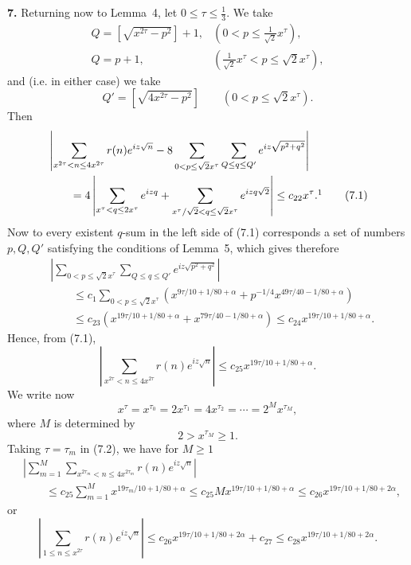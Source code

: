 \documentclass[11pt]{article}
\begin{document}
\medskip
\noindent\textbf{7.}
Returning now to Lemma~4, let $0\leq\tau\leq\frac13$. We take
\[
\begin{array}{ll}
 Q=\left[\sqrt{x^{2\tau}-p^2}\right]+1,
 &\displaystyle\left(0<p\leq\frac1{\sqrt2}x^\tau\right),\\[6pt]
 Q=p+1,
 &\displaystyle\left(\frac1{\sqrt2}x^\tau<p\leq\sqrt2x^\tau\right),
\end{array}
\]
and (i.e. in either case) we take
\[
 Q'=\left[\sqrt{4x^{2\tau}-p^2}\right]
 \qquad(0<p\leq\sqrt2x^\tau).
\]
Then
\begin{align*}
&\left|\sum_{x^{2\tau}<n\leq4x^{2\tau}}r(n)e^{iz\sqrt n}
 -8\sum_{0<p\leq\sqrt2x^\tau}\sum_{Q\leq q\leq Q'}
 e^{iz\sqrt{p^2+q^2}}\right| \\
&\qquad=4\left|\sum_{x^\tau<q\leq2x^\tau}e^{izq}
 +\sum_{x^\tau/\sqrt2<q\leq\sqrt2x^\tau}e^{izq\sqrt2}\right|
 \leq c_{22}x^\tau.\footnotemark
\tag{7.1}
\end{align*}
Now to every existent $q$-sum in the left side of (7.1) corresponds a set of
numbers $p,Q,Q'$ satisfying the conditions of Lemma~5, which gives therefore
\begin{align*}
&\left|\sum_{0<p\leq\sqrt2x^\tau}\sum_{Q\leq q\leq Q'}
 e^{iz\sqrt{p^2+q^2}}\right| \\
&\qquad\leq c_1\sum_{0<p\leq\sqrt2x^\tau}
 \left(x^{9\tau/10+1/80+\alpha}
 +p^{-1/4}x^{49\tau/40-1/80+\alpha}\right) \\
&\qquad\leq c_{23}\left(x^{19\tau/10+1/80+\alpha}
 +x^{79\tau/40-1/80+\alpha}\right)
 \leq c_{24}x^{19\tau/10+1/80+\alpha}.
\end{align*}
Hence, from (7.1),
\begin{equation}
 \left|\sum_{x^{2\tau}<n\leq4x^{2\tau}}r(n)e^{iz\sqrt n}\right|
 \leq c_{25}x^{19\tau/10+1/80+\alpha}.
 \tag{7.2}
\end{equation}
We write now
\[
 x^\tau=x^{\tau_0}=2x^{\tau_1}=4x^{\tau_2}=\cdots=2^M x^{\tau_M},
\]
where $M$ is determined by
\[
 2>x^{\tau_M}\geq1.
\]
Taking $\tau=\tau_m$ in (7.2), we have for $M\geq1$
\begin{align*}
&\left|\sum_{m=1}^{M}\sum_{x^{2\tau_m}<n\leq4x^{2\tau_m}}
 r(n)e^{iz\sqrt n}\right| \\
&\qquad\leq c_{25}\sum_{m=1}^{M}x^{19\tau_m/10+1/80+\alpha}
 \leq c_{25}Mx^{19\tau/10+1/80+\alpha}
 \leq c_{26}x^{19\tau/10+1/80+2\alpha},
\end{align*}
or
\[
 \left|\sum_{1\leq n\leq x^{2\tau}}r(n)e^{iz\sqrt n}\right|
 \leq c_{26}x^{19\tau/10+1/80+2\alpha}+c_{27}
 \leq c_{28}x^{19\tau/10+1/80+2\alpha}.
\]
\end{document}
